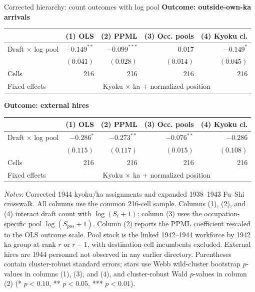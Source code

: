\documentclass{beamer}
\begin{document}
\begin{frame}[t]{Corrected hierarchy: count outcomes with log pool}
\centering\tiny\vspace{-0.5em}
\textbf{Outcome: outside-own-ka arrivals}\\[-1pt]
\begin{tabular}{lrrrr}\toprule
 & (1) OLS & (2) PPML & (3) Occ. pools & (4) Kyoku cl. \\\midrule
Draft $\times$ log pool & $-0.149^{**}$ & $-0.099^{***}$ & $0.017$ & $-0.149^{*}$ \\
 & $(0.041)$ & $(0.028)$ & $(0.014)$ & $(0.045)$ \\
Cells & 216 & 216 & 216 & 216 \\
Fixed effects & \multicolumn{4}{c}{Kyoku $\times$ ka + normalized position} \\\bottomrule\end{tabular}
\par\smallskip
\textbf{Outcome: external hires}\\[-1pt]
\begin{tabular}{lrrrr}\toprule
 & (1) OLS & (2) PPML & (3) Occ. pools & (4) Kyoku cl. \\\midrule
Draft $\times$ log pool & $-0.286^{*}$ & $-0.273^{**}$ & $-0.076^{**}$ & $-0.286$ \\
 & $(0.115)$ & $(0.117)$ & $(0.015)$ & $(0.108)$ \\
Cells & 216 & 216 & 216 & 216 \\
Fixed effects & \multicolumn{4}{c}{Kyoku $\times$ ka + normalized position} \\\bottomrule\end{tabular}
\vspace{0.4em}\raggedright
{\tiny \textit{Notes:} Corrected 1944 kyoku/ka assignments and expanded 1938--1943 Fu--Shi crosswalk. All columns use the common 216-cell sample. Columns (1), (2), and (4) interact draft count with $\log(S_i+1)$; column (3) uses the occupation-specific pool $\log(S_{pos}+1)$. Column (2) reports the PPML coefficient rescaled to the OLS outcome scale. Pool stock is the linked 1942--1944 workforce by 1942 ka group at rank $r$ or $r{-}1$, with destination-cell incumbents excluded. External hires are 1944 personnel not observed in any earlier directory. Parentheses contain cluster-robust standard errors; stars use Webb wild-cluster bootstrap $p$-values in columns (1), (3), and (4), and cluster-robust Wald $p$-values in column (2) (* $p<0.10$, ** $p<0.05$, *** $p<0.01$).}
\end{frame}
\end{document}
